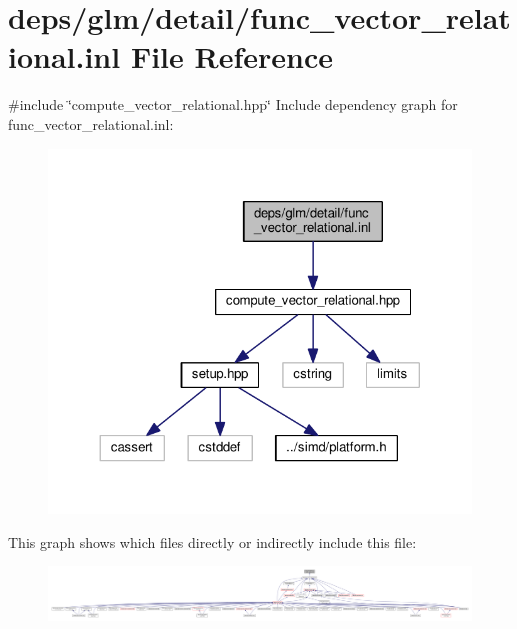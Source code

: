 \hypertarget{func__vector__relational_8inl}{}\section{deps/glm/detail/func\+\_\+vector\+\_\+relational.inl File Reference}
\label{func__vector__relational_8inl}
{\ttfamily \#include \char`\"{}compute\+\_\+vector\+\_\+relational.\+hpp\char`\"{}}\newline
Include dependency graph for func\+\_\+vector\+\_\+relational.\+inl\+:
\nopagebreak
\begin{figure}[H]
\begin{center}
\leavevmode
\includegraphics[width=324pt]{de/d6d/func__vector__relational_8inl__incl}
\end{center}
\end{figure}
This graph shows which files directly or indirectly include this file\+:
\nopagebreak
\begin{figure}[H]
\begin{center}
\leavevmode
\includegraphics[width=350pt]{dc/dd9/func__vector__relational_8inl__dep__incl}
\end{center}
\end{figure}
